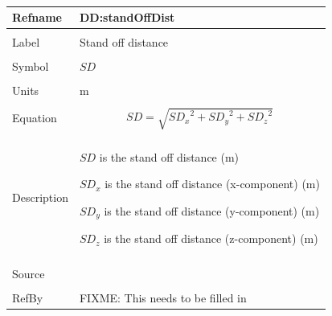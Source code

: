 \documentclass[12pt]{article}
\begin{document}
~\newline
\noindent \begin{minipage}{\textwidth}
\begin{tabular}{p{} p{}}
\toprule \textbf{Refname} & \textbf{DD:standOffDist}
\label{DD:standOffDist}
\\ \midrule \\
Label & Stand off distance
\\ \midrule \\
Symbol & $SD$
\\ \midrule \\
Units & m
\\ \midrule \\
Equation & \begin{dmath}
           SD=\sqrt{{SD_{x}}^{2}+{SD_{y}}^{2}+{SD_{z}}^{2}}
           \end{dmath}
\\ \midrule \\
Description & \begin{symbDescription}
              \item{$SD$ is the stand off distance (m)}
              \item{${SD_{x}}$ is the stand off distance (x-component) (m)}
              \item{${SD_{y}}$ is the stand off distance (y-component) (m)}
              \item{${SD_{z}}$ is the stand off distance (z-component) (m)}
              \end{symbDescription}
\\ \midrule \\
Source & 
\\ \midrule \\
RefBy & FIXME: This needs to be filled in
\\ \bottomrule \end{tabular}
\end{minipage}\\
~\newline
\end{document}

